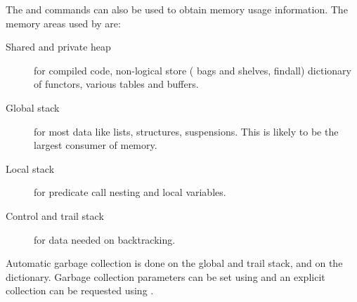 The
 and 
commands can also be used to obtain memory usage information.
The memory areas used by \eclipse{} are:
\begin{description}
\item[Shared and private heap] for compiled code, non-logical store (
    bags and shelves, findall)
    dictionary of functors, various tables and buffers.
\item[Global stack] for most \eclipse{} data like lists, structures, suspensions.
        This is likely to be the largest consumer of memory.
\item[Local stack] for predicate call nesting and local variables.
\item[Control and trail stack] for data needed on backtracking.
\end{description}
Automatic garbage collection is done on the global and trail stack,
and on the dictionary. Garbage collection parameters can be set using
and an explicit collection can be requested using
.



